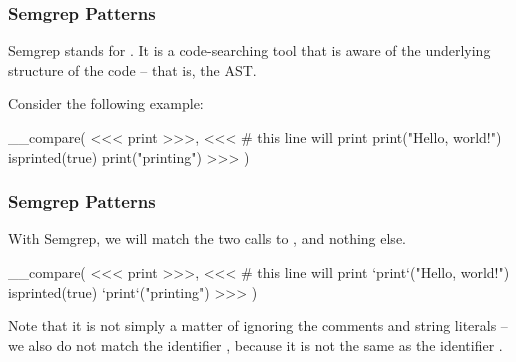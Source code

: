 \documentclass[aspectratio=169, handout]{beamer}
\begin{document}
\begin{frame}[fragile]
  \frametitle{Semgrep Patterns}

  Semgrep stands for . It is a code-searching tool that is aware
  of the underlying structure of the code -- that is, the AST.

  \vspace{\fill}

  Consider the following example:

  \vspace{5pt}

__compare(
<<<
  print
>>>,
<<<
    # this line will print
    print("Hello, world!")
    isprinted(true)
    print("printing")
>>>
)
\end{frame}

\begin{frame}[fragile]
  \frametitle{Semgrep Patterns}

  With Semgrep, we will match the two calls to , and nothing else.

  \vspace{\fill}

__compare(
<<<
  print
>>>,
<<<
    # this line will print
    `print`("Hello, world!")
    isprinted(true)
    `print`("printing")
>>>
)

  \vspace{\fill}

  Note that it is not simply a matter of ignoring the comments and string literals -- we
  also do not match the identifier , because it is not the same as the
  identifier .
\end{frame}
\end{document}

